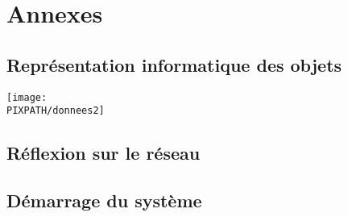 \section{Annexes}
\subsection{Représentation informatique des objets}
    \begin{center}
    \texttt{[image: \\PIXPATH/donnees2]}
    \end{center}
\subsection{Réflexion sur le réseau}
\subsection{Démarrage du système}
